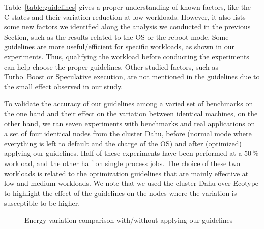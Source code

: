 Table~\ref{table:guidelines} gives a proper understanding of known factors, like the C-states and their variation reduction at low workloads.
However, it also lists some new factors we identified along the analysis we conducted in the previous Section, such as the results related to the OS or the reboot mode.
Some guidelines are more useful/efficient for specific workloads, as shown in our experiments.
Thus, qualifying the workload before conducting the experiments can help choose the proper guidelines.
Other studied factors, such as Turbo~Boost or Speculative execution, are not mentioned in the guidelines due to the small effect observed in our study.

To validate the accuracy of our guidelines among a varied set of benchmarks on the one hand and their effect on the variation between identical machines, on the other hand, we ran seven experiments with benchmarks and real applications on a set of four identical nodes from the cluster \textsf{Dahu}, before (\textsf{normal} mode where everything is left to default and the charge of the OS) and after (\textsf{optimized}) applying our guidelines.
Half of these experiments have been performed at a 50\,\% workload, and the other half on single process jobs.
The choice of these two workloads is related to the optimization guidelines that are mainly effective at low and medium workloads.
We note that we used the cluster \textsf{Dahu} over \textsf{Ecotype} to highlight the effect of the guidelines on the nodes where the variation is susceptible to be higher.

\begin{figure}[htb]
    \caption{Energy variation comparison with/without applying our guidelines}\label{fig:optimized}
\end{figure}

